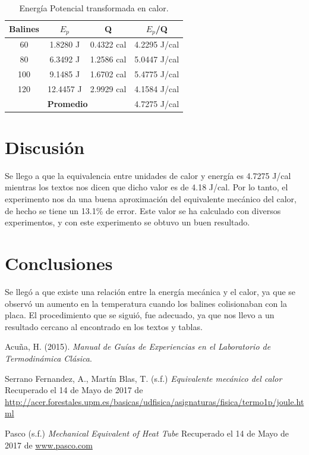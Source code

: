 \documentclass[12pt]{article}
\begin{document}
	\begin{table}[H]
		\centering
		\begin{tabular}{|c|c|c|c|}
			\hline
			Balines & $E_p$ & Q & $E_p$/Q\\ \hline
			60  & 1.8280  J & 0.4322 cal & 4.2295 J/cal \\ \hline
			80  & 6.3492  J & 1.2586 cal & 5.0447 J/cal \\ \hline
			100 & 9.1485  J & 1.6702 cal & 5.4775 J/cal  \\ \hline
			120 & 12.4457 J & 2.9929 cal & 4.1584 J/cal \\ \hline
			\multicolumn{3}{|c|}{\textbf{Promedio}} & 4.7275 J/cal \\ \hline
		\end{tabular}
		\caption{Energía Potencial transformada en calor.}
		\label{tab:Comp}
	\end{table}
\pagebreak
\section{Discusión} 
Se llego a que la equivalencia entre unidades de calor y energía es 4.7275 J/cal mientras los textos nos dicen que dicho valor es de 4.18 J/cal. Por lo tanto, el experimento nos da una buena aproximación del equivalente mecánico del calor, de hecho se tiene un 13.1\% de error. Este valor se ha calculado con diversos experimentos, y con este experimento se obtuvo un buen resultado.

\section{Conclusiones}
Se llegó a que existe una relación entre la energía mecánica y el calor, ya que se observó un aumento en la temperatura cuando los balines colisionaban con la placa. El procedimiento que se siguió, fue adecuado, ya que nos llevo a un resultado cercano al encontrado en los textos y tablas. 


\begin{thebibliography}{3}
		Acuña, H. (2015). \textit{Manual de Guías de Experiencias en el Laboratorio de Termodinámica Clásica}.

		Serrano Fernandez, A., Martín Blas, T. (s.f.) \emph{Equivalente mecánico del calor} Recuperado el 14 de Mayo de 2017 de \url{http://acer.forestales.upm.es/basicas/udfisica/asignaturas/fisica/termo1p/joule.html}
	
		Pasco (s.f.) \textit{Mechanical Equivalent of Heat Tube} Recuperado el 14 de Mayo de 2017 de \url{www.pasco.com}
\end{thebibliography}
\end{document}
